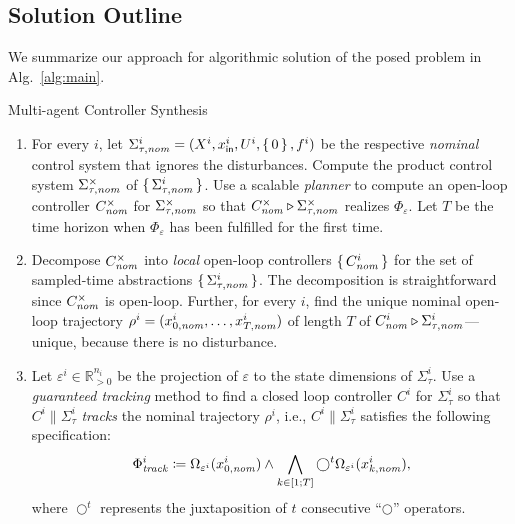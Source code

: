 
\subsection{Solution Outline}
We summarize our approach for algorithmic solution of the posed problem in Alg.~\ref{alg:main}.

\begin{algorithm}[t]
	\caption{Multi-agent Controller Synthesis}
	\label{alg:main}
	\begin{enumerate}
		\item For every $i$, let $\Sigma_{\tau,\mathit{nom}}^i = (X^i,x_{\mathsf{in}}^i,U^i,\set{0},f^i)$ be the respective \emph{nominal} control system that ignores the disturbances.
		Compute the product control system $\Sigma^\times_{\tau,\mathit{nom}}$ of $\set{\Sigma^i_{\tau,\mathit{nom}}}$. 
		Use a scalable \emph{planner} to compute an open-loop controller $C^\times_{\mathit{nom}}$ for $\Sigma^\times_{\tau,\mathit{nom}}$ so that $C^\times_{\mathit{nom}}\triangleright\Sigma_{\tau,\mathit{nom}}^{\times}$ realizes  $\Phi_\varepsilon$.
		Let $T$ be the time horizon when $\Phi_\varepsilon$ has been fulfilled for the first time. \label{step:planning}
		\item Decompose $C^\times_{\mathit{nom}}$ into \emph{local} open-loop controllers $\set{C^i_{\mathit{nom}}}$ for the set of sampled-time abstractions $\set{\Sigma^i_{\tau,\mathit{nom}}}$.
		The decomposition is straightforward since $C^\times_{\mathit{nom}}$ is open-loop. Further, for every $i$, find the unique nominal open-loop trajectory $\rho^i=(x_{0,\mathit{nom}}^i,\ldots,x_{T,\mathit{nom}}^i)$ of length $T$ of $C^i_{\mathit{nom}}\triangleright \Sigma_{\tau,\mathit{nom}}^i$---unique, because there is no disturbance. \label{step:decompose}
		\item Let $\varepsilon^i\in \mathbb{R}^{n_i}_{>0}$ be the projection of $\varepsilon$ to the state dimensions of $\Sigma_{\tau}^i$.
		Use a \emph{guaranteed tracking} method to find a closed loop controller $C^i$ for $\Sigma_{\tau}^i$ so that $C^i\parallel \Sigma_\tau^i$ \emph{tracks} the nominal trajectory $\rho^i$, i.e., $C^i\parallel \Sigma_\tau^i$ satisfies the following specification:
		\begin{align}
			\label{eq:ltl_spec}
			\Phi_{\mathit{track}}^i\coloneqq \Omega_{\varepsilon^i}(x_{0,\mathit{nom}}^i) \wedge \bigwedge_{k\in [1;T]} \bigcirc^t \Omega_{\varepsilon^i}(x_{k,\mathit{nom}}^i),
		\end{align}
		where %
		$\bigcirc^t$ represents the juxtaposition of $t$ consecutive ``$\bigcirc$'' operators.\label{step:tracking}
	\end{enumerate}
\end{algorithm}

